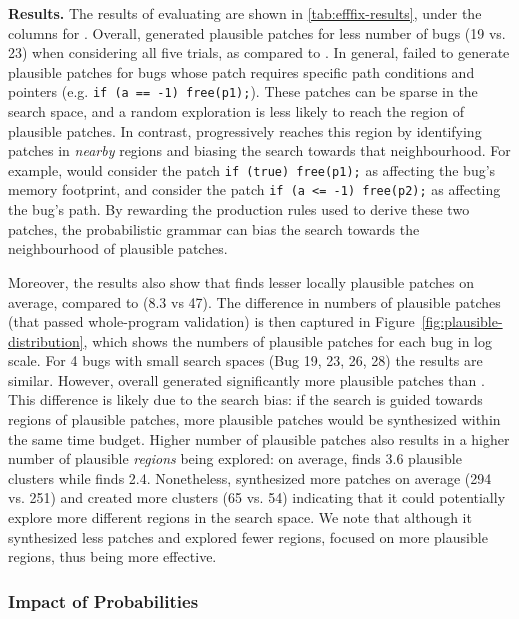 \textbf{Results.} The results of evaluating \tooluni are shown in \autoref{tab:efffix-results}, under the columns for \emph{\tooluni}.
Overall, \tooluni generated plausible patches for less number of bugs (19 vs. 23) when considering all five trials, as compared to \tool.
In general, \tooluni failed to generate plausible patches for bugs whose patch requires specific path conditions and pointers (e.g. \texttt{if (a == -1) free(p1);}).
These patches can be sparse in the search space, and a random exploration is less likely to reach the region of plausible patches.
In contrast, \tool  progressively reaches this region by identifying patches in \textit{nearby} regions and biasing the search towards that neighbourhood.
For example, \tool would consider the patch \texttt{if (true) free(p1);} as affecting the bug's memory footprint, and consider the patch \texttt{if (a <= -1) free(p2);} as affecting the bug's path.
By rewarding the production rules used to derive these two patches, the probabilistic grammar can bias the search towards the neighbourhood of plausible patches.

Moreover, the results also show that \tooluni finds lesser locally plausible patches on average, compared to \tool (8.3 vs 47). 
The difference in numbers of plausible patches (that passed whole-program validation)
is then captured in Figure~\ref{fig:plausible-distribution}, which shows the numbers of plausible patches for each bug in log scale.
For 4 bugs with small search spaces (Bug 19, 23, 26, 28) 
the results are similar.
However, overall \tool generated significantly more plausible patches than \tooluni.
This difference is likely due to the search bias: if the search is guided towards regions of plausible patches, more plausible patches would be synthesized within the same time budget.
Higher number of plausible patches also results in a higher number of plausible \textit{regions} being explored: on average, \tool finds 3.6 plausible clusters while \tooluni finds 2.4.
Nonetheless, \tooluni synthesized more patches on average (294 vs. 251)
and created more clusters (65 vs. 54) indicating that it could potentially explore more different regions in the search space.
We note that although it synthesized less patches and explored fewer regions, \tool focused on more plausible regions, thus being more effective.


\subsubsection*{Impact of Probabilities}

